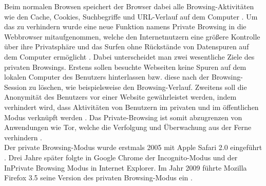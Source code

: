 Beim \glqq{}normalen\grqq{} Browsen speichert der Browser dabei alle Browsing-Aktivitäten wie den  Cache, Cookies, Suchbegriffe und URL-Verlauf auf dem Computer \cite{Izzati.2022}. Um das zu verhindern wurde eine neue Funktion namens \glqq{}Private Browsing\grqq{} in die Webbrowser mitaufgenommen, welche den Internetnutzern eine größere Kontrolle über ihre Privatsphäre und das Surfen ohne Rückstände von Datenspuren auf dem Computer ermöglicht \cite{Said.2011}. Dabei unterscheidet man zwei wesentliche Ziele des privaten Browsings. Erstens sollen besuchte Webseiten keine Spuren auf dem lokalen Computer des Benutzers hinterlassen bzw. diese nach der Browsing-Session zu löschen, wie beispielsweise den Browsing-Verlauf. Zweitens soll die Anonymität des Benutzers vor einer Website gewährleistet werden, indem verhindert wird, dass Aktivitäten von Benutzern im privaten und im öffentlichen Modus verknüpft werden \cite{Aggarwal.2010,Montasari.2015}. Das Private-Browsing ist somit abzugrenzen von Anwendungen wie Tor, welche die Verfolgung und Überwachung aus der Ferne verhindern \cite{Horsman.2019}.\\
Der private Browsing-Modus wurde erstmals 2005 mit Apple Safari 2.0 eingeführt \cite{Said.2011}. Drei Jahre später folgte in Google Chrome der \glqq{}Incognito-Modus\grqq{} und der \glqq{}InPrivate Browsing Modus\grqq{} in Internet Explorer. Im Jahr 2009 führte Mozilla Firefox 3.5 seine Version des privaten Browsing-Modus ein \cite{Montasari.2015}.\\

